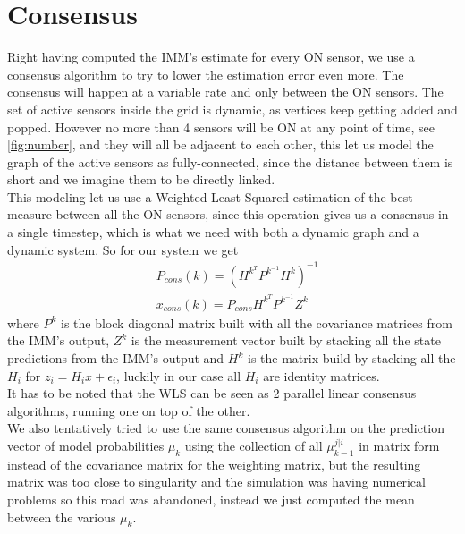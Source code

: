 \documentclass[twocolumn]{article}
\begin{document}
\section*{Consensus}
    Right having computed the IMM's estimate for every ON sensor, we use a consensus algorithm to try to lower the 
    estimation error even more. The consensus will happen at a variable rate and only between the ON sensors.
    The set of active sensors inside the grid is dynamic, as vertices keep getting added and popped. However no
     more than 4 sensors will be ON at any point of time, see \ref{fig:number}, and they will all be adjacent to each other, 
     this let us model the graph of the active sensors as fully-connected, since the distance between them is short 
     and we imagine them to be directly linked.
     \\
     This modeling let us use a Weighted Least Squared estimation of the best measure between all the ON sensors, since this operation 
     gives us a consensus in a single timestep, which is what we need with both a dynamic graph and a dynamic system.
    So for our system we get 
    \begin{align*}
        &P_{cons}(k)=(H^{k^{T}}P^{k^{-1}}H^{k})^{-1}\\
        &x_{cons}(k)=P_{cons}H^{k^{T}}P^{k^{-1}}Z^{k}
    \end{align*}
    where $P^{k}$ is the block diagonal matrix built with all the covariance matrices from the IMM's output, $Z^{k}$ 
    is the measurement vector built by stacking all the state predictions from the IMM's output and $H^{k}$ is the matrix build by 
    stacking all the $H_{i}$ for $z_{i}=H_{i}x+\epsilon_{i}$, luckily in our case all $H_{i}$ are identity matrices.\\
     It has to be noted that the WLS can be seen as 2 parallel linear consensus algorithms, running one on top of the other.
    \\
    We also tentatively tried to use the same consensus algorithm on the prediction vector of model probabilities $\mu_{k}$ using 
    the collection of all $\mu^{j|i}_{k-1}$ in matrix form instead of the covariance matrix for the weighting matrix, but 
    the resulting matrix was too close to singularity and the simulation was having numerical problems so this road 
    was abandoned, instead we just computed the mean between the various $\mu_{k}$. 
\end{document}
